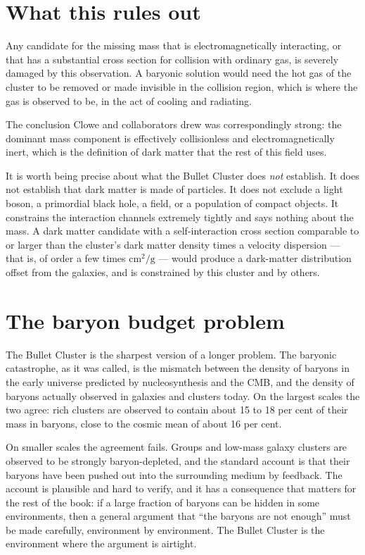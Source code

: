 \section{What this rules out}Any candidate for the missing mass that is electromagnetically
interacting, or that has a substantial cross section for collision with
ordinary gas, is severely damaged by this observation. A baryonic solution
would need the hot gas of the cluster to be removed or made invisible in the
collision region, which is where the gas is observed to be, in the act of
cooling and radiating.

The conclusion Clowe and collaborators drew was correspondingly strong: the
dominant mass component is effectively collisionless and electromagnetically
inert, which is the definition of dark matter that the rest of this field
uses.

It is worth being precise about what the Bullet Cluster does \emph{not}
establish. It does not establish that dark matter is made of particles.
It does not exclude a light boson, a primordial black hole, a field, or a
population of compact objects. It constrains the interaction channels
extremely tightly and says nothing about the mass. A dark matter candidate
with a self-interaction cross section comparable to or larger than the
cluster's dark matter density times a velocity dispersion --- that is, of
order a few times $\mathrm{cm}^2/\mathrm{g}$ --- would produce a dark-matter
distribution offset from the galaxies, and is constrained by this cluster and
by others.

\section{The baryon budget problem}The Bullet Cluster is the sharpest version of a longer problem.
The baryonic catastrophe, as it was called, is the mismatch between the
density of baryons in the early universe predicted by nucleosynthesis and
the CMB, and the density of baryons actually observed in galaxies and
clusters today. On the largest scales the two agree: rich clusters are
observed to contain about 15 to 18 per cent of their mass in baryons, close
to the cosmic mean of about 16 per cent.

On smaller scales the agreement fails. Groups and low-mass galaxy clusters
are observed to be strongly baryon-depleted, and the standard account is
that their baryons have been pushed out into the surrounding medium by
feedback. The account is plausible and hard to verify, and it has a
consequence that matters for the rest of the book: if a large fraction of
baryons can be hidden in some environments, then a general argument that
``the baryons are not enough'' must be made carefully, environment by
environment. The Bullet Cluster is the environment where the argument is
airtight.


